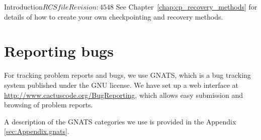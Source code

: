 \begin{cactuspart}{Introduction}{$RCSfile$}{$Revision: 4548 $}
See Chapter~\ref{chap:cp_recovery_methods} for details of how to create
your own checkpointing and recovery methods.



\chapter{Reporting bugs}
\label{sec:gehe}

For tracking problem reports and bugs, we use GNATS, which is a bug tracking
system published under the GNU license. We have set up a web interface at
\url{http://www.cactuscode.org/BugReporting}, which allows easy submission and browsing
of problem reports.

A description of the GNATS categories we use is provided in the Appendix
\ref{sec:Appendix.gnats}.





\end{cactuspart}
